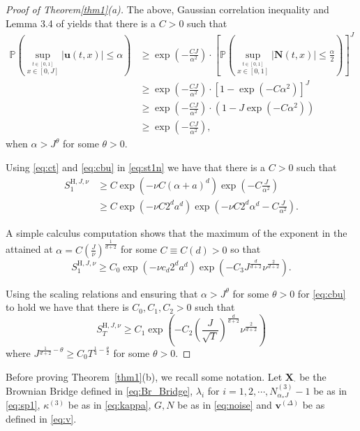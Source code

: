 \documentclass[12pt]{amsart}
\numberwithin{equation}{section}
\theoremstyle{definition}
\numberwithin{equation}{section}
\newcommand{\be}{\begin{equation}}
\newcommand{\ee}{\end{equation}}
\newcommand{\mP}{\mathbb{P}}
\newcommand{\X}{\mathbf{X}}
\newcommand{\HH}{\text{H}}
\newcommand{\N}{\mathbf{N}}
\newcommand{\uv}{\mathbf u}
\newcommand{\vv}{\mathbf v}
\begin{document}
\begin{proof}[Proof of Theorem\ref{thm1}(a)]
The above, Gaussian correlation inequality and Lemma 3.4 of \cite{athr-jose-muel} yields that there is a $C>0$ such that
\begin{align} \label{eq:cbu}
\mP\left(\sup_{\stackrel{t\in [0,1]}{x\in [0,J]}} |\uv(t,x)|\le \alpha\right) & \ge \exp\left(-\frac{CJ}{\alpha^2}\right) \cdot \left[\mP\left(\sup_{\stackrel{t\in [0,1]}{x\in [0,1]}} |\N(t,x)| \le \frac{\alpha}{2}\right)\right]^J  \nonumber \\
& \ge \exp\left(-\frac{CJ}{\alpha^2}\right) \cdot \left[1-\exp(-C\alpha^2)\right]^J \nonumber \\
& \ge \exp\left(-\frac{CJ}{\alpha^2}\right) \cdot \left(1-J \exp(-C\alpha^2)\right) \nonumber\\
&\ge \exp\left(-\frac{CJ}{\alpha^2}\right),
\end{align}
when $\alpha >J^\theta$ for some $\theta >0$.
 

Using \eqref{eq:ct} and \eqref{eq:cbu} in \eqref{eq:st1n} we have that there is a $C>0$ such that 
\begin{equation*}
\begin{split}
S_1^{\HH, J,\nu} &\ge  C\exp\left(-\nu C (\alpha+a)^d\right) \exp\left(-C\frac{J}{\alpha^2}\right) \\
&\ge C\exp\left(-\nu C 2^da^d\right) \exp\left(-\nu C 2^d\alpha^d -C\frac{J}{\alpha^2}\right).
\end{split}
\end{equation*}

A simple calculus computation shows that the maximum of the exponent in the attained at $\alpha=C \left(\frac{J}{\nu}\right)^{\frac{1}{d+2}}$ for some $C\equiv C(d)>0$ so that 
\be \label{eq:endlba}S_1^{\HH, J,\nu} \ge C_0 \exp\left(-\nu c_d 2^da^d\right) \exp\left( -C_3 J^{\frac{d}{d+2}}\nu^{\frac{2}{d+2}}\right).\ee

Using the scaling relations and ensuring that $\alpha > J^\theta$ for some $\theta >0$ for \eqref{eq:cbu} to hold  we have that there is $C_0, C_1, C_2 >0$ such that  
\[ S_T^{\HH, J, \nu} \ge C_1\exp\left(-C_2\left(\frac{J}{\sqrt{T}}\right)^{\frac{d}{d+2}}\nu^{\frac{2}{d+2}}\right)\]
where $J^{\frac{1}{d+2} -\theta} \ge C_0T^{\frac{1}{4} -\frac{\theta}{2}}$ for some $\theta >0$.
\end{proof}



Before proving Theorem~\ref{thm1}(\textup{b}), we recall some notation.
Let $\X_\cdot$ be  the Brownian Bridge  defined in \eqref{eq:Br_Bridge}, $ \lambda_i$ for $ i=1,2,\cdots,  N^{(3)}_{\alpha_*J}-1 $ be as in \eqref{eq:sp1}, $ \kappa^{(3)}$ be as in \eqref{eq:kappa},  $G, N$ be as in \eqref{eq:noise} and $\vv^{(\Delta)}$ be as defined in \eqref{eq:v}.  
\end{document}
